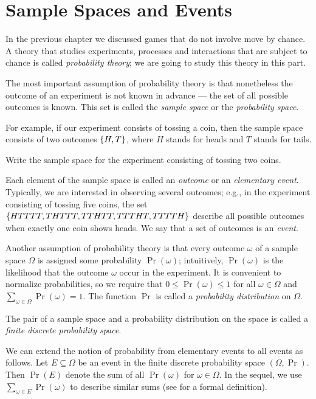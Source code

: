 \chapter{Sample Spaces and Events}
In the previous chapter we discussed games that do not involve move by chance.
A theory that studies experiments, processes and interactions that are subject
to chance is called \emph{probability theory}; we are going to study this theory
in this part.

The most important assumption of probability theory is that nonetheless the
outcome of an experiment is not known in advance --- the set of all possible
outcomes is known. This set is called the \emph{sample space} or the
\emph{probability space}.

For example, if our experiment consists of tossing a coin, then the sample space
consists of two outcomes $\set{H, T}$, where $H$ stands for heads and $T$ stands
for tails.
\begin{exercise}
  Write the sample space for the experiment consisting of tossing two coins.
\end{exercise}
Each element of the sample space is called an \emph{outcome} or an
\emph{elementary event}. Typically, we are interested in observing several
outcomes; e.g., in the experiment consisting of tossing five coins, the set
$\set{HTTTT, THTTT, TTHTT, TTTHT, TTTTH}$ describe all possible outcomes when
exactly one coin shows heads. We say that a set of outcomes is an \emph{event}.

Another assumption of probability theory is that every outcome $\omega$ of a
sample space $\Omega$ is assigned some probability $\Pr(\omega)$; intuitively,
$\Pr(\omega)$ is the likelihood that the outcome $\omega$ occur in the
experiment. It is convenient to normalize probabilities, so we require that 
$0 \le \Pr(\omega) \le 1$ for all $\omega \in \Omega$ and 
$\sum_{\omega \in \Omega} \Pr(\omega) = 1$. The function $\Pr$ is called
a \emph{probability distribution} on $\Omega$.

The pair of a sample space and a probability distribution on the space is called
a \emph{finite discrete probability space}.


We can extend the notion of probability from elementary events to all events as
follows. Let $E \subseteq \Omega$ be an event in the finite discrete probability
space $(\Omega, \Pr)$. Then $\Pr(E)$ denote the sum of all $\Pr(\omega)$ for
$\omega \in \Omega$. In the sequel, we use $\sum_{\omega \in E} \Pr(\omega)$ to
describe similar sums (see  for a formal
definition).


